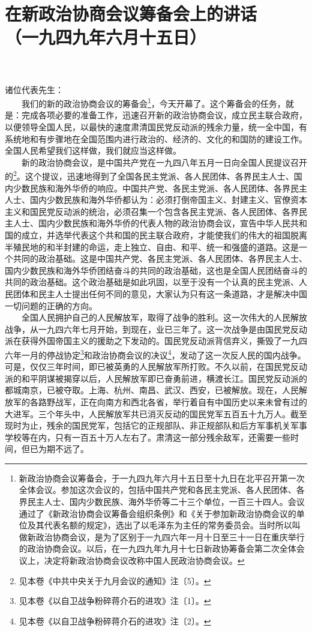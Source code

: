 \documentclass[cn,11pt,chinese]{elegantbook}
\def\myformat#1{\hfil\hfil #1}
\begin{document}
\newpage\section*{\myformat{在新政治协商会议筹备会上的讲话}\\\myformat{（一九四九年六月十五日）}}\\~\\
诸位代表先生：\\
　　我们的新的政治协商会议的筹备会\footnote[1]{ 新政治协商会议筹备会，于一九四九年六月十五日至十九日在北平召开第一次全体会议。参加这次会议的，包括中国共产党和各民主党派、各人民团体、各界民主人士、国内少数民族、海外华侨等二十三个单位，一百三十四人。会议通过了《新政治协商会议筹备会组织条例》和《关于参加新政治协商会议的单位及其代表名额的规定》，选出了以毛泽东为主任的常务委员会。当时所以叫做新政治协商会议，是为了区别于一九四六年一月十日至三十一日在重庆举行的政治协商会议。以后，在一九四九年九月十七日新政协筹备会第二次全体会议上，决定将新政治协商会议改称中国人民政治协商会议。}，今天开幕了。这个筹备会的任务，就是：完成各项必要的准备工作，迅速召开新的政治协商会议，成立民主联合政府，以便领导全国人民，以最快的速度肃清国民党反动派的残余力量，统一全中国，有系统地和有步骤地在全国范围内进行政治的、经济的、文化的和国防的建设工作。全国人民希望我们这样做，我们就应当这样做。\\
　　新的政治协商会议，是中国共产党在一九四八年五月一日向全国人民提议召开的\footnote[2]{ 见本卷《中共中央关于九月会议的通知》注〔5〕。}。这个提议，迅速地得到了全国各民主党派、各人民团体、各界民主人士、国内少数民族和海外华侨的响应。中国共产党、各民主党派、各人民团体、各界民主人士、国内少数民族和海外华侨都认为：必须打倒帝国主义、封建主义、官僚资本主义和国民党反动派的统治，必须召集一个包含各民主党派、各人民团体、各界民主人士、国内少数民族和海外华侨的代表人物的政治协商会议，宣告中华人民共和国的成立，并选举代表这个共和国的民主联合政府，才能使我们的伟大的祖国脱离半殖民地的和半封建的命运，走上独立、自由、和平、统一和强盛的道路。这是一个共同的政治基础。这是中国共产党、各民主党派、各人民团体、各界民主人士、国内少数民族和海外华侨团结奋斗的共同的政治基础，这也是全国人民团结奋斗的共同的政治基础。这个政治基础是如此巩固，以至于没有一个认真的民主党派、人民团体和民主人士提出任何不同的意见，大家认为只有这一条道路，才是解决中国一切问题的正确的方向。\\
　　全国人民拥护自己的人民解放军，取得了战争的胜利。这一次伟大的人民解放战争，从一九四六年七月开始，到现在，业已三年了。这一次战争是由国民党反动派在获得外国帝国主义的援助之下发动的。国民党反动派背信弃义，撕毁了一九四六年一月的停战协定\footnote[3]{ 见本卷《以自卫战争粉碎蒋介石的进攻》注〔1〕。}和政治协商会议的决议\footnote[4]{ 见本卷《以自卫战争粉碎蒋介石的进攻》注〔2〕。}，发动了这一次反人民的国内战争。可是，仅仅三年时间，即已被英勇的人民解放军所打败。不久以前，在国民党反动派的和平阴谋被揭穿以后，人民解放军即已奋勇前进，横渡长江。国民党反动派的都城南京，已被夺取。上海、杭州、南昌、武汉、西安，已被解放。现在，人民解放军的各路野战军，正在向南方和西北各省，举行着自有中国历史以来未曾有过的大进军。三个年头中，人民解放军共已消灭反动的国民党军五百五十九万人。截至现时为止，残余的国民党军，包括它的正规部队、非正规部队和后方军事机关军事学校等在内，只有一百五十万人左右了。肃清这一部分残余敌军，还需要一些时间，但已为期不远了。\\
\end{document}
